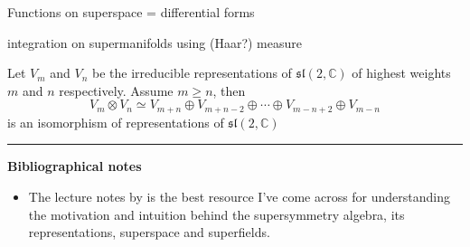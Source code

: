 Functions on superspace = differential forms

integration on supermanifolds using (Haar?) measure


\begin{thm}
	Let $V_m$ and $V_n$ be the irreducible representations of
	$\mathfrak{sl}(2,\mathbb{C})$ of highest weights $m$ and $n$ respectively.
	Assume  $m\geq n$, then
	\[
	V_m \otimes V_n \simeq V_{m+n} \oplus V_{m+n-2} \oplus \cdots \oplus 
	V_{m-n+2} \oplus V_{m-n}
	\] 
	is an isomorphism of representations of $\mathfrak{sl}(2,\mathbb{C})$
\end{thm}
\begin{comment}
	The idea of the proof is to define formal characters of lie algebra reps.
	prove two reps are isomorphic iff they have the same character. 
	Then show how the character behaves under direct sum and tensor product.
	Then show that the two sides have the same character.
\end{comment}


\vspace{5mm}
\hrule 
\vspace{5mm}

\textbf{Bibliographical notes}
{\small
\begin{itemize}
	\item The lecture notes by \citet{tongSUSY} is the best resource I've come
	across for understanding the motivation and intuition behind the
	supersymmetry algebra, its representations, superspace and superfields.
\end{itemize}
}


